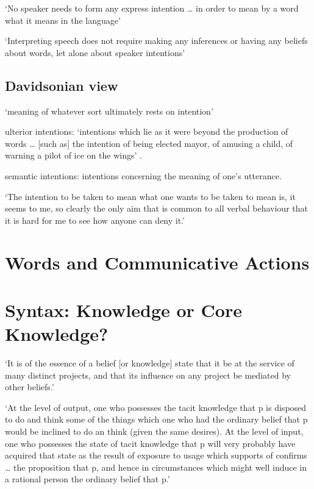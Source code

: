 \documentclass[12pt]{extarticle}
\begin{document}
\begin{multicols}{3}
‘No speaker needs to form any express intention … in order to mean by a word what it means in the language’
\citep[p.\ 473]{Dummett:1986mq}
 
‘Interpreting speech does not require making any inferences or having any beliefs about words, let alone about speaker intentions’
\citep[p.\ 62]{Millikan:1984ib}
 
\subsection{Davidsonian view}
 
‘meaning of whatever sort ultimately rests on intention’
\citep[p.\ 298]{Davidson:1992pl}
 
ulterior intentions: ‘intentions which lie as it were beyond the production of words … [such as] the intention of being elected mayor, of amusing a child, of warning a pilot of ice on the wings’ \citep[p.\ 298]{Davidson:1992pl}.
 
semantic intentions: intentions concerning the meaning of one’s utterance.
 
‘The intention to be taken to mean what one wants to be taken to mean is, it seems to me, so clearly the only aim that is common to all verbal behaviour that it is hard for me to see how anyone can deny it.’
\citep[p.\ 11]{Davidson:1994ol}
 
 
 
\section{Words and Communicative Actions}
 
 
 
\section{Syntax: Knowledge or Core Knowledge?}
 
‘It is of the essence of a belief [or knowledge] state that it be at the service of many distinct projects, and that its influence on any project be mediated by other beliefs.’
\citep[p.\ 337]{Evans:1981pc}
 
‘At the level of output, one who possesses the tacit knowledge that p is disposed to do and think some of the things which one who had the ordinary belief that p would be inclined to do an think (given the same desires).
At the level of input, one who possesses the state of tacit knowledge that p will very probably have acquired that state as the result of exposure to usage which supports of confirms … the proposition that p, and hence in circumstances which might well induce in a rational person the ordinary belief that p.’
\citep[p.\ 336]{Evans:1981pc}
 

\end{multicols}
\end{document}
